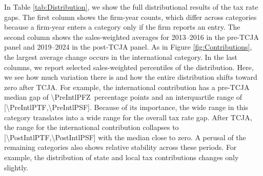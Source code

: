 \documentclass[11pt,letterpaper]{article}
\newcommand{\ShareNum}[1]{\num[round-mode=places,round-precision=1]{#1}}
\begin{document}
In Table \ref{tab:Distribution}, we show the full distributional results of the
tax rate gaps.
The first column shows the firm-year counts, which differ across
categories because a firm-year enters a category only if the firm
reports an entry.
The second column shows the sales-weighted averages for 
2013--2016 in the pre-TCJA panel and 2019--2024 in the post-TCJA panel.
As in Figure \ref{fig:Contributions}, the largest average change
occurs in the international category.
In the last columns, we report selected sales-weighted percentiles of the
distribution.
Here, we see how much variation there is and how the
entire distribution shifts toward zero after TCJA. 
For example, the international contribution 
has a pre-TCJA median gap of 
\ShareNum{\PreIntlPFZ}\ percentage points and an interquartile range of
[\ShareNum{\PreIntlPTF},\ShareNum{\PreIntlPSF}].
Because of its importance, the wide range in this category translates 
into a wide range for the overall tax rate gap.
After TCJA, the range for the international contribution collapses to 
[\ShareNum{\PostIntlPTF},\ShareNum{\PostIntlPSF}] 
with the median close to zero.
A perusal of the remaining categories also shows relative stability
across these periods.  For example, the distribution of state and local tax 
contributions changes only slightly.

%
%
\end{document}
